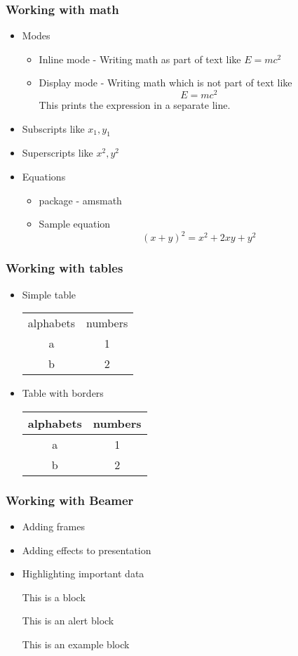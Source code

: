 \documentclass{beamer}
\begin{document}
\begin{frame}
\frametitle{Working with math}
\begin{itemize}
\item Modes
\begin{itemize}
\item Inline mode - Writing math as part of text like $E=mc^2$
\item Display mode - Writing math which is not part of text like $$E=mc^2$$ This prints the expression in a separate line.
\end{itemize}
\item Subscripts like $x_1, y_1$
\item Superscripts like $x^2, y^2$
\item Equations
\begin{itemize}
\item package - amsmath
\item Sample equation
\begin{equation}
(x+y)^2 = x^2 + 2xy + y^2
\end{equation}
\end{itemize}
\end{itemize}
\end{frame}
\begin{frame}
\frametitle{Working with tables}
\begin{itemize}
\item Simple table
\begin{center}
\begin{tabular}{c c}
alphabets & numbers\\
a & 1\\
b & 2\\
\end{tabular}
\end{center}
\item Table with borders
\begin{center}
\begin{tabular}{|c| c|}
\hline
alphabets & numbers\\
\hline
a & 1\\
b & 2\\
\hline
\end{tabular}
\end{center}
\end{itemize}
\end{frame}
\begin{frame}
\frametitle{Working with Beamer}
\begin{itemize}
\item<1-> Adding frames
\item<2-> Adding effects to presentation
\item<3-> \alert{Highlighting important data}
\\<4->
\begin{block}{This is a block}
\end{block}
\begin{alertblock}{This is an alert block}
\end{alertblock}
\begin{examples}{This is an example block}
\end{examples}
\end{itemize}
\end{frame}
\end{document}
